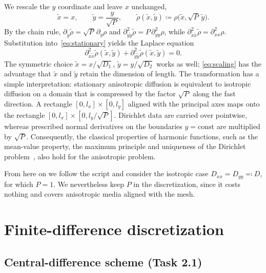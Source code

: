 \documentclass[11pt,a4paper]{article}
\numberwithin{equation}{section}
\theoremstyle{definition}
\theoremstyle{remark}
\begin{document}
We rescale the $y$ coordinate and leave $x$ unchanged,
\begin{equation}\label{eq:scaling}
  \tilde{x} = x,
  \qquad
  \tilde{y} = \frac{y}{\sqrt{P}},
  \qquad
  \tilde{\rho}(\tilde{x},\tilde{y}) \coloneqq \rho\bigl(\tilde{x}, \sqrt{P}\,\tilde{y}\bigr).
\end{equation}
By the chain rule, $\partial_{\tilde{y}}\tilde{\rho} = \sqrt{P}\,\partial_y\rho$ and
$\partial^2_{\tilde{y}\tilde{y}}\tilde{\rho} = P\,\partial^2_{yy}\rho$, while
$\partial^2_{\tilde{x}\tilde{x}}\tilde{\rho} = \partial^2_{xx}\rho$. Substitution
into~\eqref{eq:stationary} yields the Laplace equation
\begin{equation}\label{eq:laplace}
  \boxed{\;
    \partial^2_{\tilde{x}\tilde{x}}\tilde{\rho}(\tilde{x},\tilde{y})
    + \partial^2_{\tilde{y}\tilde{y}}\tilde{\rho}(\tilde{x},\tilde{y}) = 0.
  \;}
\end{equation}
The symmetric choice $\tilde{x} = x/\sqrt{D_1}$, $\tilde{y} = y/\sqrt{D_2}$ works as well;
\eqref{eq:scaling} has the advantage that $\tilde{x}$ and $\tilde{y}$ retain the dimension
of length. The transformation has a simple interpretation: stationary anisotropic
diffusion is equivalent to isotropic diffusion on a domain that is compressed by the
factor $\sqrt{P}$ along the fast direction. A rectangle $[0, l_x]\times[0, l_y]$ aligned
with the principal axes maps onto the rectangle $[0, l_x]\times[0, l_y/\sqrt{P}]$.
Dirichlet data are carried over pointwise, whereas prescribed normal derivatives on the
boundaries $y = \text{const}$ are multiplied by $\sqrt{P}$. Consequently, the classical
properties of harmonic functions, such as the mean-value property, the maximum principle
and uniqueness of the Dirichlet problem~\citep{evans2010}, also hold for the anisotropic
problem.

From here on we follow the script and consider the isotropic case
$D_{xx} = D_{yy} \eqqcolon D$, for which $P = 1$. We nevertheless keep $P$ in the
discretization, since it costs nothing and covers anisotropic media aligned with the
mesh.

\section{Finite-difference discretization}\label{sec:fd}

\subsection{Central-difference scheme (Task 2.1)}\label{sec:scheme}
\end{document}
